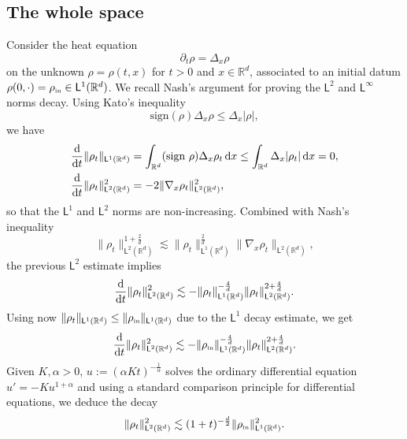 \documentclass[11pt]{amsart}
\theoremstyle{definition}
\theoremstyle{remark}
\numberwithin{equation}{section}
\newcommand\R{{\mathbb R}}
\newcommand{\dd}{{\, \mathrm d}}
\newcommand{\dt}{\frac{{\rm d}}{{\rm d}t}}
\newcommand{\init}{\text{{\tiny {\rm in}}}}
\newcommand{\sfL}{\mathsf{L}}
\begin{document}
\subsection{The whole space}

Consider the heat equation
\begin{equation}
  \label{eq:heat}
  \partial_t \rho = \Delta_x \rho
\end{equation}
on the unknown $\rho = \rho(t,x)$ for $t >0$ and $x \in \R^d$, associated to an  initial datum $\rho(0, \cdot)=\rho_{\init} \in \sfL^{1}(\R^d)$. We recall Nash's argument for proving the $\sfL^2$ and $\sfL^\infty$ norms decay. Using Kato's inequality
\begin{equation*}
  \text{sign}(\rho) \Delta_x \rho \le \Delta_x |\rho|,
\end{equation*}
we have
\begin{align}
  \nonumber
  & \dt \| \rho_{t} \|_{\sfL^{1}(\R^d)} = \int_{\R^d} (\text{sign } \rho) \Delta_x \rho_{t} \dd x \le \int_{\R^d} \Delta_x |\rho_{t}| \dd x =0, \\
  \label{eq:heat-energy}
  & \dt \| \rho_{t} \|_{\sfL^{2}(\R^d)}^{2} = - 2 \| \nabla_x \rho_{t} \|_{\sfL^{2}(\R^d)}^{2},
\end{align}
so that the $\sfL^{1}$ and $\sfL^{2}$ norms are non-increasing. Combined with Nash's inequality~\cite{Nash}
\begin{equation}
  \label{eq:nash}
  \| \rho_{t} \|_{\sfL^{2}(\R^d)} ^{1+\frac{2}{d}} \lesssim \| \rho_{t} \|_{\sfL^{1}(\R^d)}^{\frac{2}{d}} \| \nabla_x \rho_{t} \|_{\sfL^{2}(\R^d)}, 
\end{equation}
the previous $\sfL^{2}$ estimate implies
\begin{equation*}
  \dt \| \rho_{t} \|_{\sfL^{2}(\R^d)}^2 \lesssim - \| \rho_{t} \|_{\sfL^{1}(\R^d)} ^{-\frac{4}{d}} \| \rho_{t} \|_{\sfL^{2}(\R^d)}^{2 + \frac{4}{d}}.
\end{equation*}
Using now $\| \rho_{t} \|_{\sfL^{1}(\R^d)} \le \| \rho_{\init} \|_{\sfL^{1}(\R^d)}$ due to the $\sfL^{1}$ decay estimate, we get
\begin{equation*}
  \dt \| \rho_{t} \|_{\sfL^{2}(\R^d)}^2 \lesssim - \| \rho_{\init} \|_{\sfL^{1}(\R^d)} ^{-\frac{4}{d}} \| \rho_{t} \|_{\sfL^{2}(\R^d)}^{2 + \frac{4}{d}}.
\end{equation*}
Given $K,\alpha>0$, $u := (\alpha  K t)^{-\frac{1}{\alpha}}$ solves the ordinary differential equation $u' = - K u^{1+\alpha}$ and using a  standard comparison principle for differential equations, we deduce  the decay
\begin{equation*}
  \| \rho_{t} \|_{\sfL^{2}(\R^d)}^2 \lesssim (1+t)^{-\frac{d}2} \| \rho_{\init} \|_{\sfL^{1}(\R^d)}^2.
\end{equation*}
\end{document}
